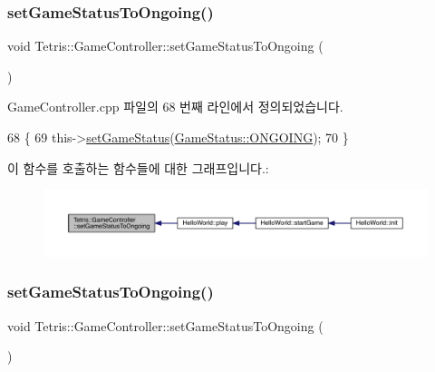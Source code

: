 \subsubsection{\texorpdfstring{set\+Game\+Status\+To\+Ongoing()}{setGameStatusToOngoing()}\hspace{0.1cm}{\footnotesize\ttfamily [1/2]}}
{\footnotesize\ttfamily void Tetris\+::\+Game\+Controller\+::set\+Game\+Status\+To\+Ongoing (\begin{DoxyParamCaption}{ }\end{DoxyParamCaption})}



Game\+Controller.\+cpp 파일의 68 번째 라인에서 정의되었습니다.


\begin{DoxyCode}
68                                                \{
69                 this->\hyperlink{class_tetris_1_1_game_controller_a013cef75ba09bdb7d95ae1df8497b8f5}{setGameStatus}(\hyperlink{class_tetris_1_1_game_controller_a96a963b56385f3b3a122ff0ca2beb770acff9d04a8a29792d319be9177afb8ba3}{GameStatus::ONGOING});
70             \}
\end{DoxyCode}
이 함수를 호출하는 함수들에 대한 그래프입니다.\+:
\nopagebreak
\begin{figure}[H]
\begin{center}
\leavevmode
\includegraphics[width=350pt]{db/dd2/class_tetris_1_1_game_controller_a47681985e6fbf14411a70be08f85bf99_icgraph}
\end{center}
\end{figure}
\mbox{\label{class_tetris_1_1_game_controller_a47681985e6fbf14411a70be08f85bf99}} 
\subsubsection{\texorpdfstring{set\+Game\+Status\+To\+Ongoing()}{setGameStatusToOngoing()}\hspace{0.1cm}{\footnotesize\ttfamily [2/2]}}
{\footnotesize\ttfamily void Tetris\+::\+Game\+Controller\+::set\+Game\+Status\+To\+Ongoing (\begin{DoxyParamCaption}{ }\end{DoxyParamCaption})\hspace{0.3cm}{\ttfamily [inline]}}



